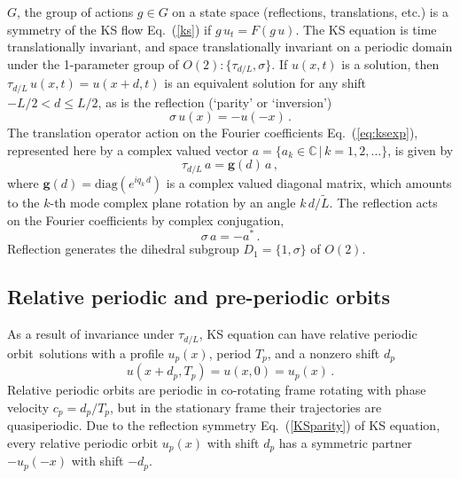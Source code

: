 \documentclass[aip,cha,showpacs,reprint]{revtex4-1} %
\newcommand{\beq}{\begin{equation}}
\newcommand{\eeq}{\end{equation}}
\newcommand{\refeq}  [1] {Eq.~(\ref{#1})}                   %
\newcommand{\etc}{{etc.}}
\newcommand{\Refl}{\ensuremath{\sigma}}
\newcommand{\rpo}{rela\-ti\-ve periodic orbit}
\newcommand{\Rpo}{Rela\-ti\-ve periodic orbit}
\newcommand{\period}[1]{{\ensuremath{T_{#1}}}}
\newcommand{\Shift}{\ensuremath{\tau}}
\newcommand{\shift}{\ensuremath{d}}
\newcommand{\velRel}{\ensuremath{c}}    %
\begin{document}
$G$, the group of actions $ g \in G $ on a
state space (reflections, translations, \etc) is a symmetry of the KS
flow \refeq{ks} if $g\,u_t = F(g\,u)$.
The KS equation is time translationally invariant, and space translationally invariant
on a periodic domain under
the 1-parameter group of
$O(2): \{\Shift_{\shift/L},\Refl \}$.
If $u(x,t)$ is a solution, then
$\Shift_{\shift/L}\, u(x,t) = u(x+\shift,t)$
is an equivalent solution for any shift
$-L/2 < \shift \leq L/2$,
as is the
reflection (`parity' or `inversion')
\beq
    \Refl \, u(x) = -u(-x)
\,.
\label{KSparity}
\eeq
The translation operator action on the Fourier coefficients \refeq{eq:ksexp},
represented here by a complex valued vector
$a = \{a_k\in\mathbb{C}\,|\,k = 1, 2, \ldots\}$, is given by
\beq
  \Shift_{\shift/L}\, a = \mathbf{g}(\shift) \, a \,,
\label{eq:shiftFour}
\eeq
where $\mathbf{g}(\shift) = \mbox{diag}( e^{i q_k\, \shift} )$ is a complex
valued diagonal matrix, which amounts to the $k$-th mode complex plane
rotation by an angle $k\, \shift /\tilde{L}$.  The reflection acts on
the Fourier coefficients by complex conjugation,
\beq
  \Refl \, a = -a^\ast
\,.
\label{FModInvSymm}
\eeq
Reflection generates the dihedral subgroup $D_1 = \{1, \Refl\}$
of $O(2)$.

\subsection{Relative periodic and pre-periodic orbits}
\label{s:rpoNumerics}

As a result of invariance under $\Shift_{\shift/L}$,
KS equation can have \rpo\ solutions
with a profile $u_p(x)$, period $\period{p}$, and a
nonzero shift $\shift_p$
\beq
  u(x+\shift_p,\period{p}) = u(x,0) = u_p(x)
\,.
\label{eq:KSrpos}
\eeq
{\Rpo s} are periodic in
co-rotating frame rotating with phase velocity
$\velRel_p=\shift_p/\period{p}$, but in the stationary frame
their trajectories are quasiperiodic.  Due to the reflection symmetry
\refeq{KSparity} of KS equation, every {\rpo} $u_p(x)$ with shift
$\shift_p$ has a symmetric partner $-u_p(-x)$ with shift $-\shift_p$.
\end{document}
